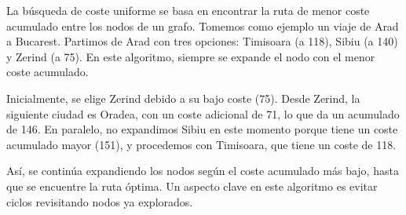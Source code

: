 

La búsqueda de coste uniforme se basa en encontrar la ruta de menor coste acumulado entre los nodos de un grafo. Tomemos como ejemplo un viaje de Arad a Bucarest. Partimos de Arad con tres opciones: Timisoara (a 118), Sibiu (a 140) y Zerind (a 75). En este algoritmo, siempre se expande el nodo con el menor coste acumulado.

Inicialmente, se elige Zerind debido a su bajo coste (75). Desde Zerind, la siguiente ciudad es Oradea, con un coste adicional de 71, lo que da un acumulado de 146. En paralelo, no expandimos Sibiu en este momento porque tiene un coste acumulado mayor (151), y procedemos con Timisoara, que tiene un coste de 118.

Así, se continúa expandiendo los nodos según el coste acumulado más bajo, hasta que se encuentre la ruta óptima. Un aspecto clave en este algoritmo es evitar ciclos revisitando nodos ya explorados.

